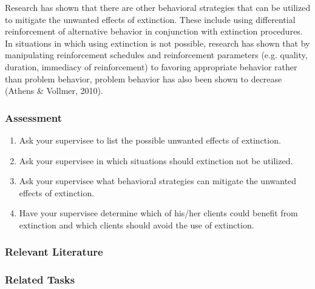 Research has shown that there are other behavioral strategies that can be utilized to mitigate the unwanted effects of extinction. These include using differential reinforcement of alternative behavior in conjunction with extinction procedures. In situations in which using extinction is not possible, research has shown that by manipulating reinforcement schedules and reinforcement parameters (e.g. quality, duration, immediacy of reinforcement) to favoring appropriate behavior rather than problem behavior, problem behavior has also been shown to decrease (Athens \& Vollmer, 2010).
%
\subsection{Assessment}
\begin{enumerate}
\item Ask your supervisee to list the possible unwanted effects of extinction.
\item Ask your supervisee in which situations should extinction not be utilized.
\item Ask your supervisee what behavioral strategies can mitigate the unwanted effects of extinction.
\item Have your supervisee determine which of his/her clients could benefit from extinction and which clients should avoid the use of extinction. 
%
\end{enumerate}
%
\subsection{Relevant Literature}
\begin{refsection}
\nocite{athens2010investigation,
    cooper2007applied,
    lerman1995prevalence,
    lerman1999side}
\printbibliography[heading=none]
\end{refsection}
%
\subsection{Related Tasks}
\fourdTwo{}\\
\fourdEighteen{}\\
\fourdNineteen{}\\
\foureOne{}\\
\foureEight{}\\
%
%
%
%
\chapter{\foursecd{}}
\section{\fourdOne{}}
